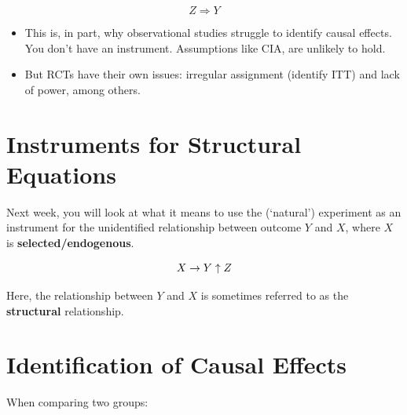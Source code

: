 \documentclass[
  letterpaper,
  DIV=11,
  numbers=noendperiod]{scrreprt}
\providecommand{\tightlist}{%
  \setlength{\itemsep}{0pt}\setlength{\parskip}{0pt}}\usepackage{longtable,booktabs,array}
\theoremstyle{definition}
\theoremstyle{remark}
\begin{document}
\[
Z \Rightarrow Y
\]

\begin{itemize}
\tightlist
\item
  This is, in part, why observational studies struggle to identify
  causal effects. You don't have an instrument. Assumptions like CIA,
  are unlikely to hold.
\item
  But RCTs have their own issues: irregular assignment (identify ITT)
  and lack of power, among others.
\end{itemize}

\section*{Instruments for Structural
Equations}\label{instruments-for-structural-equations}


Next week, you will look at what it means to use the (`natural')
experiment as an instrument for the unidentified relationship between
outcome \(Y\) and \(X\), where \(X\) is \textbf{selected/endogenous}.

\[
X \rightarrow Y \\
\uparrow \\
Z
\]

Here, the relationship between \(Y\) and \(X\) is sometimes referred to
as the \textbf{structural} relationship.

\section*{Identification of Causal
Effects}\label{identification-of-causal-effects}


When comparing two groups:
\end{document}
